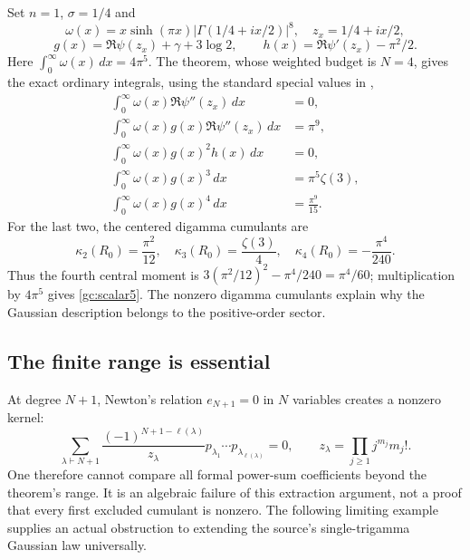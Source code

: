 \documentclass[11pt,a4paper]{article}
\numberwithin{equation}{section}
\theoremstyle{definition}
\theoremstyle{remark}
\begin{document}
Set $n=1$, $\sigma=1/4$ and
\[
 \omega(x)=x\sinh(\pi x)|\Gamma(1/4+ix/2)|^8,
 \quad z_x=1/4+ix/2,
\]
\[
 g(x)=\Re\psi(z_x)+\gamma+3\log2,\qquad
 h(x)=\Re\psi'(z_x)-\pi^2/2.
\]
Here $\int_0^\infty\omega(x)\,dx=4\pi^5$.
The theorem, whose weighted budget is $N=4$, gives the exact ordinary
integrals, using the standard special values in \cite[\S5.15]{DLMF},
\begin{align}
 \int_0^\infty\omega(x)\Re\psi''(z_x)\,dx&=0,
                                                    \label{gc:scalar1}\\
 \int_0^\infty\omega(x)g(x)\Re\psi''(z_x)\,dx&=\pi^9,
                                                    \label{gc:scalar2}\\
 \int_0^\infty\omega(x)g(x)^2h(x)\,dx&=0,
                                                    \label{gc:scalar3}\\
 \int_0^\infty\omega(x)g(x)^3\,dx&=\pi^5\zeta(3),
                                                    \label{gc:scalar4}\\
 \int_0^\infty\omega(x)g(x)^4\,dx&=\frac{\pi^9}{15}.
                                                    \label{gc:scalar5}
\end{align}
For the last two, the centered digamma cumulants are
\[
 \kappa_2(R_0)=\frac{\pi^2}{12},\quad
 \kappa_3(R_0)=\frac{\zeta(3)}4,\quad
 \kappa_4(R_0)=-\frac{\pi^4}{240}.
\]
Thus the fourth central moment is
$3(\pi^2/12)^2-\pi^4/240=\pi^4/60$; multiplication by
$4\pi^5$ gives \eqref{gc:scalar5}.
The nonzero digamma cumulants explain why the Gaussian description
belongs to the positive-order sector.

\subsection{The finite range is essential}

At degree $N+1$, Newton's relation $e_{N+1}=0$ in $N$ variables creates
a nonzero kernel:
\begin{equation}\label{gc:firstrelation}
 \sum_{\lambda\vdash N+1}
       \frac{(-1)^{N+1-\ell(\lambda)}}{z_\lambda}
                 p_{\lambda_1}\cdots p_{\lambda_{\ell(\lambda)}}=0,
 \qquad z_\lambda=\prod_{j\ge1}j^{m_j}m_j!.
\end{equation}
One therefore cannot compare all formal power-sum coefficients beyond
the theorem's range. It is an algebraic failure of this extraction
argument, not a proof that every first excluded cumulant is nonzero.
The following limiting example supplies an actual obstruction to
extending the source's single-trigamma Gaussian law universally.
\end{document}
